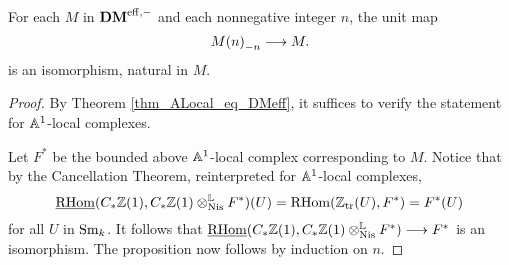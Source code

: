 \begin{cor}\label{cor_tZ_hZ_eq_id}
For each $M$ in $\DMeff$ and each nonnegative integer $n$, 
the unit map
\[
\hZ[n]{\tZ[n]{M}} \to M.
\]
is an isomorphism, natural in $M$.
\end{cor}
\begin{proof}
By Theorem \ref{thm_ALocal_eq_DMeff}, it suffices to verify the
statement for $\A^1$-local complexes. 

Let $F^*$ be the bounded above $\A^1$-local complex corresponding 
to $M$. Notice that by the Cancellation Theorem, reinterpreted for
$\A^1$-local complexes,
\[
\sheaf{\rhom}(\suslC \Z(1), \suslC \Z(1) \tLNis F^*)(U) = 
\rhom(\Ztr(U), F^*) = F^*(U)
\]
for all $U$ in $\Sm$. It follows that $\sheaf{\rhom}(\suslC\Z(1),
\suslC\Z(1) \tLNis F^*) \to F^*$ is an isomorphism. The
proposition now follows by induction on $n$.
\end{proof}

